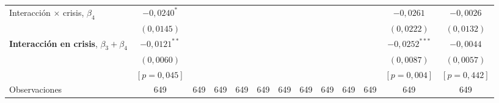 \begin{adjustbox}{max width=0.97\textwidth}
\begin{tabular}{l c ccc ccc ccc cc}
Interacción $\times$ crisis, $\beta_4$ & $-0{,}0240^{*}$ &  &  &  &  &  &  &  &  &  & $-0{,}0261$ & $-0{,}0026$ \\
 & $(0{,}0145)$ &  &  &  &  &  &  &  &  &  & $(0{,}0222)$ & $(0{,}0132)$ \\
\textbf{Interacción en crisis}, $\beta_3+\beta_4$ & $-0{,}0121^{**}$ &  &  &  &  &  &  &  &  &  & $-0{,}0252^{***}$ & $-0{,}0044$ \\
 & $(0{,}0060)$ &  &  &  &  &  &  &  &  &  & $(0{,}0087)$ & $(0{,}0057)$ \\
 & $[p=0{,}045]$ &  &  &  &  &  &  &  &  &  & $[p=0{,}004]$ & $[p=0{,}442]$ \\
\addlinespace
Observaciones & 649 & 649 & 649 & 649 & 649 & 649 & 649 & 649 & 649 & 649 & 649 & 649 \\
\bottomrule
\end{tabular}
\end{adjustbox}\endgroup
